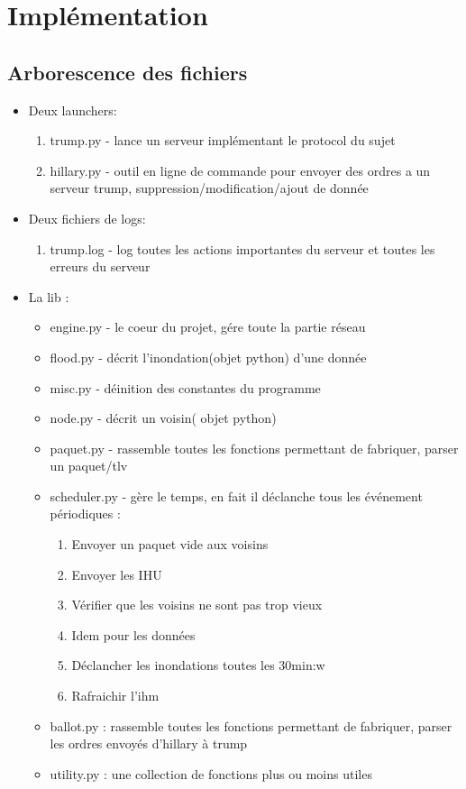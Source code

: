 \documentclass{report}
\begin{document}
\section{Implémentation}

\subsection{Arborescence des fichiers}
\begin{itemize}
 \item Deux launchers:
 \begin{enumerate}
  \item trump.py - lance un serveur implémentant le protocol du sujet
  \item hillary.py - outil en ligne de commande pour envoyer des ordres a un serveur trump,
    suppression/modification/ajout de donnée
 \end{enumerate}
 \item Deux fichiers de logs:
 \begin{enumerate}
  \item trump.log - log toutes les actions importantes du serveur et 
  toutes les erreurs du serveur
 \end{enumerate}

 \item La lib :
 \begin{itemize}
  \item engine.py - le coeur du projet, gére toute la partie réseau 
  \item flood.py - décrit l'inondation(objet python) d'une donnée
  \item misc.py - déinition des constantes du programme
  \item node.py - décrit un voisin( objet python)
  \item paquet.py - rassemble toutes les fonctions permettant de fabriquer, parser un paquet/tlv
  \item scheduler.py - gère le temps, en fait il déclanche tous les événement périodiques :
  \begin{enumerate}
   \item Envoyer un paquet vide aux voisins
   \item Envoyer les IHU
   \item Vérifier que les voisins ne sont pas trop vieux
   \item Idem pour les données
   \item Déclancher les inondations toutes les 30min:w
   \item Rafraichir l'ihm
  \end{enumerate}

  \item ballot.py :  rassemble toutes les fonctions permettant de fabriquer, parser les ordres envoyés d'hillary à trump
  \item utility.py : une collection de fonctions plus ou moins utiles
 \end{itemize}
\end{itemize}
\end{document}
